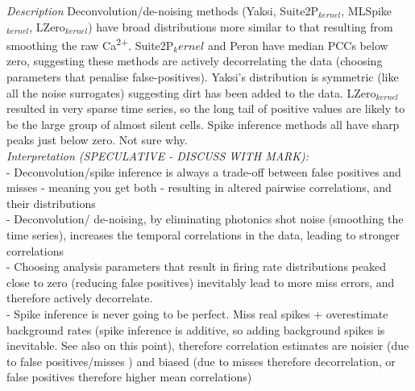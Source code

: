 \documentclass[a4paper,10pt,twocolumn]{article}
\begin{document}
\emph{Description}
Deconvolution/de-noising methods (Yaksi, Suite2P$_{kernel}$, MLSpike$_{kernel}$, LZero$_{kernel}$) have broad distributions more similar to that resulting from smoothing the raw Ca\textsuperscript{2+}. Suite2P$_kernel$ and Peron have median PCCs below zero, suggesting these methods are actively decorrelating the data (choosing parameters that penalise false-positives). Yaksi's distribution is symmetric (like all the noise surrogates) suggesting dirt has been added to the data. LZero$_{kernel}$ resulted in very sparse time series, so the long tail of positive values are likely to be the large group of almost silent cells. Spike inference methods all have sharp peaks just below zero. Not sure why.\\

\emph{Interpretation (SPECULATIVE - DISCUSS WITH MARK):}\\ 
\indent - Deconvolution/spike inference is always a trade-off between false positives and misses - meaning you get both - resulting in altered pairwise correlations, and their distributions\\
- Deconvolution/ de-noising, by eliminating photonics shot noise (smoothing the time series), increases the temporal correlations in the data, leading to stronger correlations\\
- Choosing analysis parameters that result in firing rate distributions peaked close to zero (reducing false positives) inevitably lead to more miss errors, and therefore actively decorrelate.\\
\indent - Spike inference is never going to be perfect. Miss real spikes + overestimate background rates (spike inference is additive, so adding background spikes is inevitable. See also \citealt{Ganmor2016-uf} on this point), therefore correlation estimates are noisier (due to false positives/misses ) and biased (due to misses therefore decorrelation, or false positives therefore higher mean correlations)\\





\end{document}
